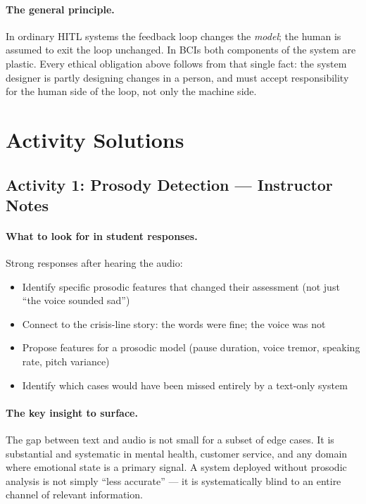 \paragraph{The general principle.}
In ordinary HITL systems the feedback loop changes the \emph{model}; the human is assumed to exit the loop unchanged. In BCIs both components of the system are plastic. Every ethical obligation above follows from that single fact: the system designer is partly designing changes in a person, and must accept responsibility for the human side of the loop, not only the machine side.

\section{Activity Solutions}

\subsection{Activity 1: Prosody Detection --- Instructor Notes}

\paragraph{What to look for in student responses.}

Strong responses after hearing the audio:
\begin{itemize}
    \item Identify specific prosodic features that changed their assessment (not just ``the voice sounded sad'')
    \item Connect to the crisis-line story: the words were fine; the voice was not
    \item Propose features for a prosodic model (pause duration, voice tremor, speaking rate, pitch variance)
    \item Identify which cases would have been missed entirely by a text-only system
\end{itemize}

\paragraph{The key insight to surface.}

The gap between text and audio is not small for a subset of edge cases. It is substantial and systematic in mental health, customer service, and any domain where emotional state is a primary signal. A system deployed without prosodic analysis is not simply ``less accurate'' --- it is systematically blind to an entire channel of relevant information.


